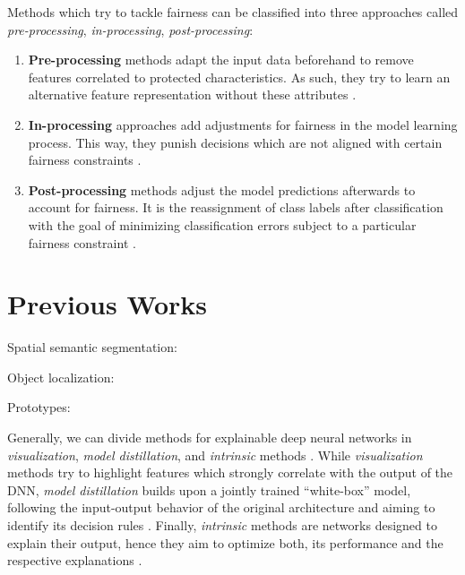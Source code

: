 Methods which try to tackle fairness can be classified into three approaches called \emph{pre-processing}, \emph{in-processing}, \emph{post-processing}:
\begin{enumerate}
    \item \textbf{Pre-processing} methods adapt the input data beforehand to remove features correlated to protected characteristics. As such, they try to learn an alternative feature representation without these attributes \citep{GordalizaBGL19, CalmonWVRV17, LouizosSLWZ15, ZemelWSPD13}. 
    \item \textbf{In-processing} approaches add adjustments for fairness in the model learning process. This way, they punish decisions which are not aligned with certain fairness constraints \citep{DworkIKL18, DoniniOBSP18, AgarwalBD0W18}.
    \item \textbf{Post-processing} methods adjust the model predictions afterwards to account for fairness. It is the reassignment of class labels after classification with the goal of minimizing 
    classification errors subject to a particular fairness constraint \citep{HardtPNS16,PleissRWKW17, FeldmanFMSV15}.
\end{enumerate}


\section{Previous Works}

\citep{BargalZKZMS18} \citep{SelvarajuCDVPB20} \citep{SimonyanVZ13} \citep{ZhangBLBSS18} \citep{ChenLTBRS19} 
\citep{CaoLYYWWHWHXRH15} \citep{SelvarajuLSJGHB19} \citep{RossHD17}

Spatial semantic segmentation: \citep{LiWPE018} \citep{ZhouZYQJ18} \citep{WeiFLCZY17}

Object localization: \citep{ZhangWF0H18}

 Prototypes: \citep{LiLCR18}
 
 Generally, we can divide methods for explainable deep neural networks in \emph{visualization}, \emph{model distillation}, and \emph{intrinsic} methods \citep{xie2020explainable}. While \emph{visualization} methods try to highlight features which strongly correlate with the output of the DNN, \emph{model distillation} builds upon a jointly trained ``white-box'' model, following the input-output behavior of the original architecture and aiming to identify its decision rules \citep{xie2020explainable}. Finally, \emph{intrinsic} methods are networks designed to explain their output, hence they aim to optimize both, its performance and the respective explanations \citep{xie2020explainable}.

